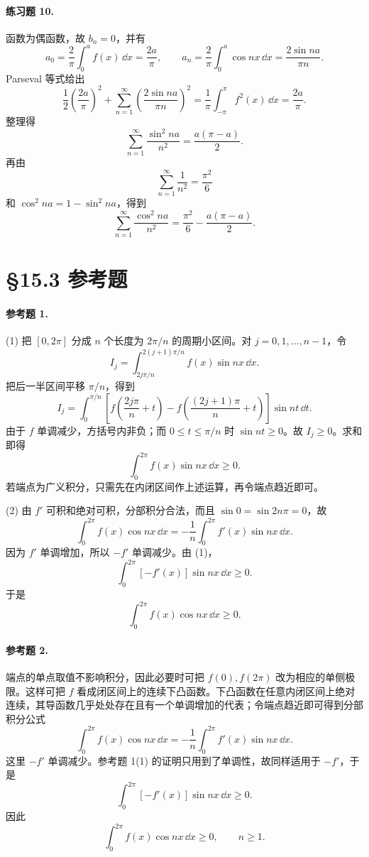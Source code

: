 \paragraph{练习题 10.}
\begin{xsolution}
函数为偶函数，故 $b_n=0$，并有
\[
  a_0=\frac2\pi\int_0^af(x)\,\dd x=\frac{2a}{\pi},
\qquad
  a_n=\frac2\pi\int_0^a\cos nx\,\dd x
  =\frac{2\sin na}{\pi n}.
\]
Parseval 等式给出
\[
  \frac12\left(\frac{2a}{\pi}\right)^2
  +\sum_{n=1}^{\infty}\left(\frac{2\sin na}{\pi n}\right)^2
  =\frac1\pi\int_{-\pi}^{\pi}f^2(x)\,\dd x
  =\frac{2a}{\pi}.
\]
整理得
\[
  \boxed{\displaystyle
  \sum_{n=1}^{\infty}\frac{\sin^2na}{n^2}
  =\frac{a(\pi-a)}2}.
\]
再由
\[
  \sum_{n=1}^{\infty}\frac1{n^2}=\frac{\pi^2}{6}
\]
和 $\cos^2na=1-\sin^2na$，得到
\[
  \boxed{\displaystyle
  \sum_{n=1}^{\infty}\frac{\cos^2na}{n^2}
  =\frac{\pi^2}{6}-\frac{a(\pi-a)}2}.
\]
\end{xsolution}

\section*{§15.3 参考题}

\paragraph{参考题 1.}
\begin{xsolution}
(1) 把 $[0,2\pi]$ 分成 $n$ 个长度为 $2\pi/n$ 的周期小区间。对 $j=0,1,\ldots,n-1$，令
\[
  I_j=\int_{2j\pi/n}^{2(j+1)\pi/n}f(x)\sin nx\,\dd x.
\]
把后一半区间平移 $\pi/n$，得到
\[
  I_j=\int_0^{\pi/n}
  \left[f\left(\frac{2j\pi}{n}+t\right)
  -f\left(\frac{(2j+1)\pi}{n}+t\right)\right]\sin nt\,\dd t.
\]
由于 $f$ 单调减少，方括号内非负；而 $0\le t\le\pi/n$ 时 $\sin nt\ge0$。故 $I_j\ge0$。求和即得
\[
  \boxed{\displaystyle
  \int_0^{2\pi}f(x)\sin nx\,\dd x\ge0}.
\]
若端点为广义积分，只需先在内闭区间作上述运算，再令端点趋近即可。

(2) 由 $f'$ 可积和绝对可积，分部积分合法，而且 $\sin0=\sin2n\pi=0$，故
\[
  \int_0^{2\pi}f(x)\cos nx\,\dd x
  =-\frac1n\int_0^{2\pi}f'(x)\sin nx\,\dd x.
\]
因为 $f'$ 单调增加，所以 $-f'$ 单调减少。由 (1)，
\[
  \int_0^{2\pi}[-f'(x)]\sin nx\,\dd x\ge0.
\]
于是
\[
  \boxed{\displaystyle
  \int_0^{2\pi}f(x)\cos nx\,\dd x\ge0}.
\]
\end{xsolution}

\paragraph{参考题 2.}
\begin{xsolution}
端点的单点取值不影响积分，因此必要时可把 $f(0),f(2\pi)$ 改为相应的单侧极限。这样可把 $f$ 看成闭区间上的连续下凸函数。下凸函数在任意内闭区间上绝对连续，其导函数几乎处处存在且有一个单调增加的代表；令端点趋近即可得到分部积分公式
\[
  \int_0^{2\pi}f(x)\cos nx\,\dd x
  =-\frac1n\int_0^{2\pi}f'(x)\sin nx\,\dd x.
\]
这里 $-f'$ 单调减少。参考题 1(1) 的证明只用到了单调性，故同样适用于 $-f'$，于是
\[
  \int_0^{2\pi}[-f'(x)]\sin nx\,\dd x\ge0.
\]
因此
\[
  \boxed{\displaystyle
  \int_0^{2\pi}f(x)\cos nx\,\dd x\ge0,\qquad n\ge1 }.
\]
\end{xsolution}

